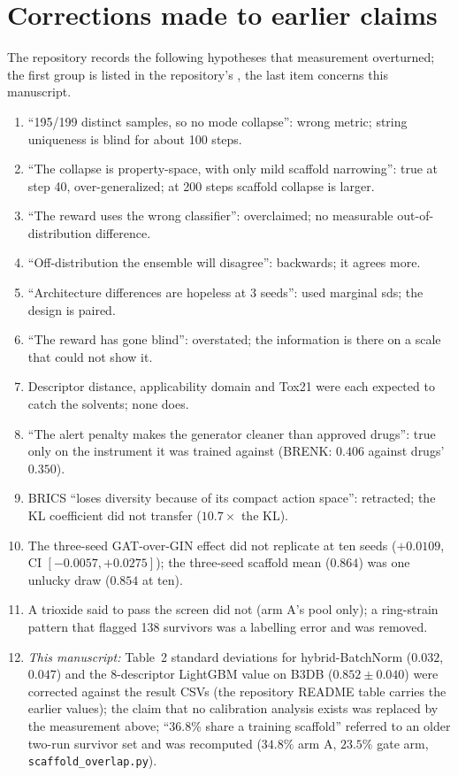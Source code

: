 \documentclass[10pt,letterpaper]{article}
\begin{document}
\section{Corrections made to earlier claims}
The repository records the following hypotheses that measurement overturned; the first group is listed in the repository's , the last item concerns this manuscript.
\begin{enumerate}[leftmargin=2.4em]
\item ``195/199 distinct samples, so no mode collapse'': wrong metric; string uniqueness is blind for about 100 steps.
\item ``The collapse is property-space, with only mild scaffold narrowing'': true at step 40, over-generalized; at 200 steps scaffold collapse is larger.
\item ``The reward uses the wrong classifier'': overclaimed; no measurable out-of-distribution difference.
\item ``Off-distribution the ensemble will disagree'': backwards; it agrees more.
\item ``Architecture differences are hopeless at 3 seeds'': used marginal sds; the design is paired.
\item ``The reward has gone blind'': overstated; the information is there on a scale that could not show it.
\item Descriptor distance, applicability domain and Tox21 were each expected to catch the solvents; none does.
\item ``The alert penalty makes the generator cleaner than approved drugs'': true only on the instrument it was trained against (BRENK: $0.406$ against drugs' $0.350$).
\item BRICS ``loses diversity because of its compact action space'': retracted; the KL coefficient did not transfer ($10.7\times$ the KL).
\item The three-seed GAT-over-GIN effect did not replicate at ten seeds ($+0.0109$, CI $[-0.0057,+0.0275]$); the three-seed scaffold mean ($0.864$) was one unlucky draw ($0.854$ at ten).
\item A trioxide said to pass the screen did not (arm A's pool only); a ring-strain pattern that flagged 138 survivors was a labelling error and was removed.
\item \emph{This manuscript:} Table~2 standard deviations for hybrid-BatchNorm ($0.032$, $0.047$) and the 8-descriptor LightGBM value on B3DB ($0.852\pm0.040$) were corrected against the result CSVs (the repository README table carries the earlier values); the claim that no calibration analysis exists was replaced by the measurement above; ``36.8\% share a training scaffold'' referred to an older two-run survivor set and was recomputed ($34.8\%$ arm A, $23.5\%$ gate arm, \texttt{scaffold\_overlap.py}).
\end{enumerate}
\end{document}

